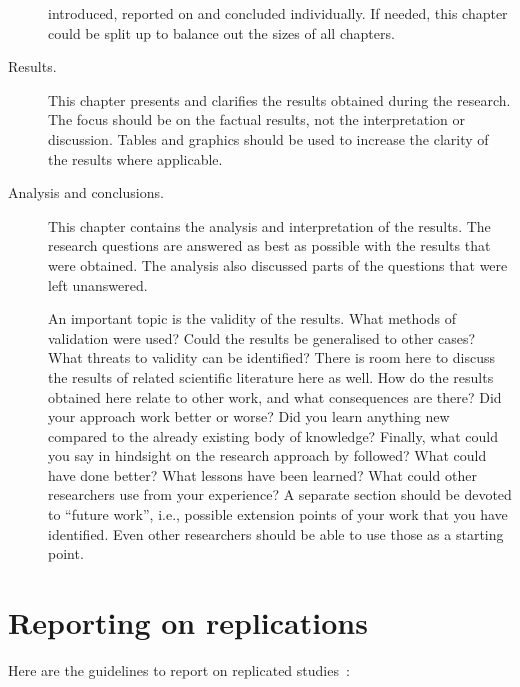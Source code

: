\documentclass{uvamscse}
\begin{document}
\begin{description}
introduced, reported on and concluded individually. If needed, this chapter
could be split up to balance out the sizes of all chapters.
  \item[Results.]
  This chapter presents and clarifies the results obtained during the
  research. The focus should be on the factual results, not the interpretation
  or discussion. Tables and graphics should be used to increase the clarity of
  the results where applicable.
  \item[Analysis and conclusions.]
  This chapter contains the analysis and interpretation of the results. The
  research questions are answered as best as possible with the results that
  were obtained. The analysis also discussed parts of the questions that were
  left unanswered.

  An important topic is the validity of the results. What methods of
  validation were used? Could the results be generalised to other cases? What
  threats to validity can be identified? There is room here to discuss the
  results of related scientific literature here as well. How do the results
  obtained here relate to other work, and what consequences are there? Did
  your approach work better or worse? Did you learn anything new compared to
  the already existing body of knowledge? Finally, what could you say in
  hindsight on the research approach by followed? What could have done better?
  What lessons have been learned? What could other researchers use from your
  experience? A separate section should be devoted to ``future work'', i.e.,
  possible extension points of your work that you have identified. Even other
  researchers should be able to use those as a starting point.
\end{description}

\section{Reporting on replications}

Here are the guidelines to report on replicated studies~\cite{Carver10}:
\end{document}
